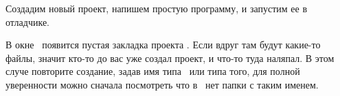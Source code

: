 \label{labecreprj}

Создадим новый проект, напишем простую программу, и запустим ее в отладчике.

\bigskip{}






 \bigskip В окне \ появится пустая закладка проекта
 . Если вдруг там будут какие-то файлы, значит кто-то до вас уже
 создал проект, и что-то туда наляпал. В этом случе повторите создание, задав
 имя типа \ или типа того, для полной
 уверенности можно сначала посмотреть что в \ нет папки с таким именем.
